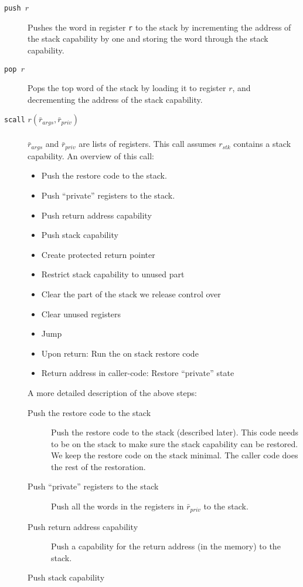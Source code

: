 \documentclass[a4paper]{article}
\newcommand{\forcenewline}{$\phantom{v}$\\}
\newcommand{\var}[1]{\mathit{#1}}
\begin{document}
\begin{description}
\item[\texttt{push $r$}] Pushes the word in register \texttt{r} to the stack by incrementing the address of the stack capability by one and storing the word through the stack capability.
\item[\texttt{pop $r$}] Pops the top word of the stack by loading it to register $r$, and decrementing the address of the stack capability.
\item[\texttt{scall} $r(\bar{r}_{\var{args}},\bar{r}_{\var{priv}})$] \forcenewline$\bar{r}_{\var{args}}$ and $\bar{r}_{\var{priv}}$ are lists of registers. This call assumes $r_{\var{stk}}$ contains a stack capability. An overview of this call:
  \begin{itemize}
  \item Push the restore code to the stack.
  \item Push ``private'' registers to the stack.
  \item Push return address capability 
  \item Push stack capability
  \item Create protected return pointer
  \item Restrict stack capability to unused part 
  \item Clear the part of the stack we release control over
  \item Clear unused registers
  \item Jump
  \item Upon return: Run the on stack restore code
  \item Return address in caller-code:  Restore ``private'' state
  \end{itemize}
  A more detailed description of the above steps:
  \begin{description}
  \item [Push the restore code to the stack]
    Push the restore code to the stack (described later). This code needs to be on the stack to make sure the stack capability can be restored. We keep the restore code on the stack minimal. The caller code does the rest of the restoration.
  \item [Push ``private'' registers to the stack]
    Push all the words in the registers in  $\bar{r}_{\var{priv}}$ to the stack.
  \item [Push return address capability]
    Push a capability for the return address (in the memory) to the stack.
  \item [Push stack capability]

\end{description}
\end{description}
\end{document}
